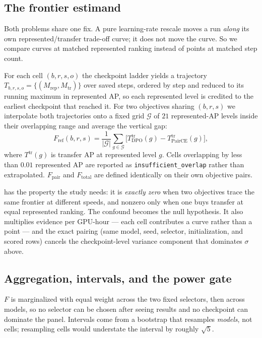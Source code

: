 \subsection{The frontier estimand}

Both problems share one fix. A pure learning-rate rescale moves a run
\emph{along} its own represented/transfer trade-off curve; it does not move the
curve. So we compare curves at matched represented ranking instead of points at
matched step count.

For each cell $(b,r,s,o)$ the checkpoint ladder yields a trajectory
$T_{b,r,s,o}=\{(M_{\mathrm{rep}},M_{\mathrm{tr}})\}$ over saved steps, ordered by
step and reduced to its running maximum in represented AP, so each represented
level is credited to the earliest checkpoint that reached it. For two objectives
sharing $(b,r,s)$ we interpolate both trajectories onto a fixed grid
$\mathcal{G}$ of $21$ represented-AP levels inside their overlapping range and
average the vertical gap:
\begin{equation}
F_{\mathrm{ref}}(b,r,s)=
\frac{1}{|\mathcal{G}|}\sum_{g\in\mathcal{G}}
\Big[T^{\mathrm{tr}}_{\mathrm{DPO}}(g)-T^{\mathrm{tr}}_{\mathrm{PairCE}}(g)\Big],
\label{eq:frontier}
\end{equation}
where $T^{\mathrm{tr}}(g)$ is transfer AP at represented level $g$. Cells
overlapping by less than $0.01$ represented AP are reported as
\texttt{insufficient\_overlap} rather than extrapolated. $F_{\mathrm{pair}}$ and
$F_{\mathrm{total}}$ are defined identically on their own objective pairs.

 has the property the study needs: it is \emph{exactly zero}
when two objectives trace the same frontier at different speeds, and nonzero only
when one buys transfer at equal represented ranking. The confound becomes the null
hypothesis. It also multiplies evidence per GPU-hour --- each cell contributes a
curve rather than a point --- and the exact pairing (same model, seed, selector,
initialization, and scored rows) cancels the checkpoint-level variance component
that dominates $\sigma$ above.

\subsection{Aggregation, intervals, and the power gate}

$F$ is marginalized with equal weight across the two fixed selectors, then across
models, so no selector can be chosen after seeing results and no checkpoint can
dominate the panel. Intervals come from a bootstrap that resamples \emph{models},
not cells; resampling cells would understate the interval by roughly $\sqrt{5}$.

